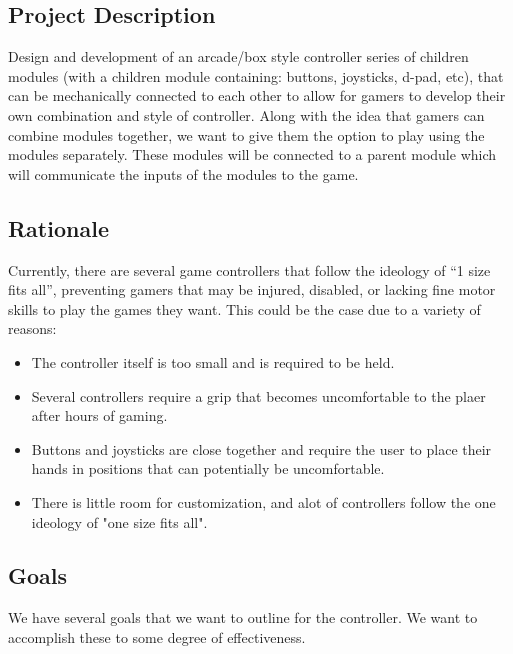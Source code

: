 \documentclass[a4]{article}
\begin{document}
\subsection{Project Description}
Design and development of an arcade/box style controller series of children modules (with a children module containing: buttons, joysticks, d-pad, etc), that can be mechanically 
connected to each other to allow for gamers to develop their own combination and style of controller. Along with the idea that gamers can combine modules together,
we want to give them the option to play using the modules separately. These modules will be connected to a parent module which will communicate the inputs of the
modules to the game.

\subsection{Rationale}
Currently, there are several game controllers that follow the ideology of “1 size fits all”, preventing gamers that may be injured, disabled, or lacking fine motor 
skills to play the games they want. This could be the case due to a variety of reasons:
\begin{itemize}
    \item The controller itself is too small and is required to be held.
    \item Several controllers require a grip that becomes uncomfortable to the plaer after hours of gaming.
    \item Buttons and joysticks are close together and require the user to place their hands in positions that can potentially be uncomfortable.
    \item There is little room for customization, and alot of controllers follow the one ideology of "one size fits all".  
\end{itemize}

\subsection{Goals}
We have several goals that we want to outline for the controller. We want to accomplish these to some degree of effectiveness.
\end{document}
